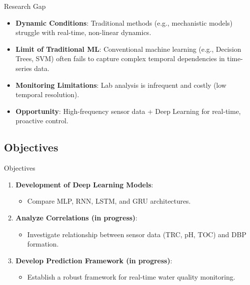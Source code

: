\documentclass[xcolor=dvipsnames]{beamer}
\begin{document}
\begin{frame}{Research Gap}
  \begin{itemize}
      \item \textbf{Dynamic Conditions}: Traditional methods (e.g., mechanistic models) struggle with real-time, non-linear dynamics.
      \item \textbf{Limit of Traditional ML}: Conventional machine learning (e.g., Decision Trees, SVM) often fails to capture complex temporal dependencies in time-series data.
      \item \textbf{Monitoring Limitations}: Lab analysis is infrequent and costly (low temporal resolution).
      \item \textbf{Opportunity}: High-frequency sensor data + Deep Learning for real-time, proactive control.
  \end{itemize}
\end{frame}

\subsection{Objectives}
\begin{frame}{Objectives}
  \begin{enumerate}
      \item \textbf{Development of Deep Learning Models}:
      \begin{itemize}
          \item Compare MLP, RNN, LSTM, and GRU architectures.
      \end{itemize}
      \item \textbf{Analyze Correlations (in progress)}:
      \begin{itemize}
          \item Investigate relationship between sensor data (TRC, pH, TOC) and DBP formation.
      \end{itemize}
      \item \textbf{Develop Prediction Framework (in progress)}:
      \begin{itemize}
          \item Establish a robust framework for real-time water quality monitoring.
      \end{itemize}
  \end{enumerate}
\end{frame}

\end{document}
